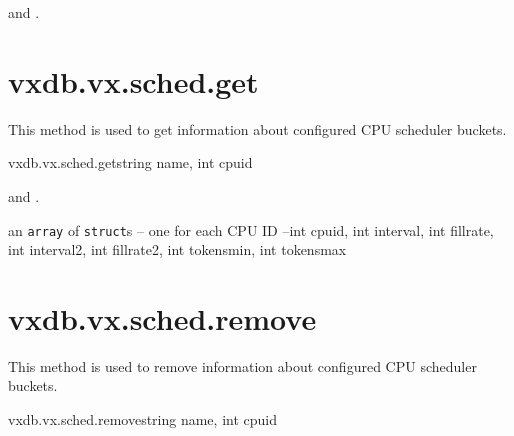 \begin{rpcaccess}
 and \rpcownerchecks.
\end{rpcaccess}

\rpcreturnnil

\rpcnoerrors


\section{vxdb.vx.sched.get}

This method is used to get information about configured CPU scheduler buckets.

\begin{rpcsynopsis}{vxdb.vx.sched.get}{string name, int cpuid}
\end{rpcsynopsis}

\begin{rpcaccess}
 and \rpcownerchecks.
\end{rpcaccess}

\begin{rpcreturncomplex}{an \texttt{array} of \texttt{struct}s -- one for each
	CPU ID --}{int cpuid, int interval, int fillrate, int interval2,
	int fillrate2, int tokensmin, int tokensmax}
\end{rpcreturncomplex}

\rpcnoerrors


\section{vxdb.vx.sched.remove}

This method is used to remove information about configured CPU scheduler
buckets.

\begin{rpcsynopsis}{vxdb.vx.sched.remove}{string name, int cpuid}
\end{rpcsynopsis}

